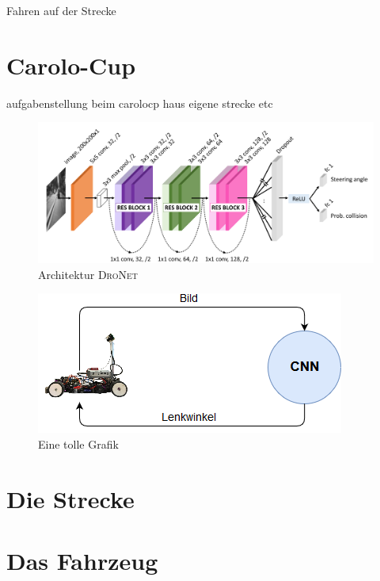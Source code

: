 Fahren auf der Strecke 


\section{Carolo-Cup}
aufgabenstellung beim carolocp
haus eigene strecke etc

\begin{figure}
	\centering
	\includegraphics[scale=0.7]{figures/Architecture-DRONET.png}
	\caption{Architektur \textsc{DroNet}}
	\label{img:DroNet}
\end{figure}




\begin{figure}
	\centering
	\includegraphics[scale=0.7]{figures/Aufbau.png}
	\caption{Eine tolle Grafik}
	\label{img:toll ist das}
\end{figure}

\section{Die Strecke}

\section{Das Fahrzeug}



